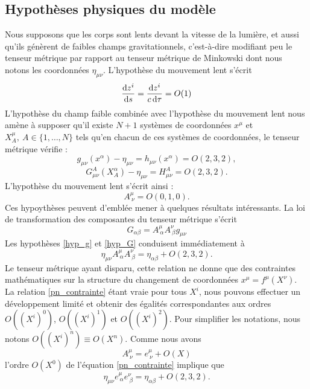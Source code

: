 		\subsection{Hypothèses physiques du modèle}
			Nous supposons que les corps sont lents devant la vitesse de la lumière, et aussi qu'ils génèrent de faibles champs gravitationnels, c'est-à-dire modifiant peu le tenseur métrique par rapport au tenseur métrique de Minkowski dont nous notons les coordonnées $\eta_{\mu\nu}$.
			L'hypothèse du mouvement lent s'écrit
			\begin{equation}
				\frac{\mathrm{d} z^i}{\mathrm{d} s} = \frac{\mathrm{d} z^i}{c \, \mathrm{d} \tau} = O(1)
			\end{equation}
			L'hypothèse du champ faible combinée avec l'hypothèse du mouvement lent nous amène à supposer qu'il existe $N+1$ systèmes de coordonnées $x^\mu$ et $X^\mu_A,\ A\in\{1,\ldots,N\}$ tels qu'en chacun de ces systèmes de coordonnées, le tenseur métrique vérifie :
			\begin{equation}\label{hyp_g}
				g_{\mu\nu}(x^\alpha)-\eta_{\mu\nu}=h_{\mu\nu}(x^\alpha)=O(2,3,2),
			\end{equation}
			\begin{equation}\label{hyp_G}
				G^A_{\mu\nu}(X^\alpha_A)-\eta_{\mu\nu}=H^A_{\mu\nu}=O(2,3,2).
			\end{equation}
			L'hypothèse du mouvement lent s'écrit ainsi :
			\begin{equation}
				A^\mu_{\ \nu}=O(0,1,0).
			\end{equation}
			Ces hypoythèses peuvent d'emblée mener à quelques résultats intéressants. La loi de transformation des composantes du tenseur métrique s'écrit
			\begin{equation}
				G_{\alpha\beta}=A^\mu_{\ \alpha}A^\nu_{\ \beta}g_{\mu\nu}
			\end{equation}
			Les hypothèses \ref{hyp_g} et \ref{hyp_G} conduisent immédiatement à 
			\begin{equation}\label{pn_contrainte}
				\eta_{\mu\nu}A^\mu_{\ \alpha}A^\nu_{\ \beta} = \eta_{\alpha\beta}+O(2,3,2).
			\end{equation}
			Le tenseur métrique ayant disparu, cette relation ne donne que des contraintes mathématiques sur la structure du changement de coordonnées $x^\mu=f^\mu(X^\nu)$. La relation \ref{pn_contrainte} étant vraie pour tous $X^i$, nous pouvons effectuer un développement limité et obtenir des égalités correspondantes aux ordres $O((X^i)^0)$, $O((X^i)^1)$ et $O((X^i)^2)$. Pour simplifier les notations, nous notons $O((X^i)^n)\equiv O(X^n)$. Comme nous avons 
			\begin{equation}
				A^\mu_{\ \nu}=e^\mu_{\ \nu}+O(X) 	
			\end{equation}
			l'ordre $O(X^0)$ de l'équation \ref{pn_contrainte} implique que
			\begin{equation}\label{o_z_pn_a}
				\eta_{\mu\nu}e^\mu_{\ \alpha}e^\nu_{\ \beta}=\eta_{\alpha\beta}+O(2,3,2).
			\end{equation}

